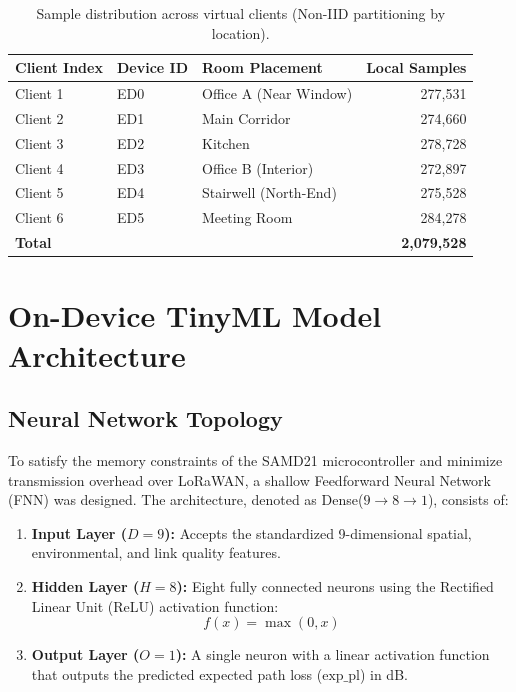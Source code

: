 \begin{table}[H]
  \centering
  \begin{tabular}{lllr}
    \toprule
    \textbf{Client Index} & \textbf{Device ID} & \textbf{Room Placement} & \textbf{Local Samples} \\
    \midrule
    Client 1 & ED0 & Office A (Near Window) & 277,531 \\
    Client 2 & ED1 & Main Corridor           & 274,660 \\
    Client 3 & ED2 & Kitchen                 & 278,728 \\
    Client 4 & ED3 & Office B (Interior)     & 272,897 \\
    Client 5 & ED4 & Stairwell (North-End)   & 275,528 \\
    Client 6 & ED5 & Meeting Room            & 284,278 \\
    \midrule
    \textbf{Total} & & & \textbf{2,079,528} \\
    \bottomrule
  \end{tabular}
  \caption{Sample distribution across virtual clients (Non-IID partitioning by location).}
  \label{tab:client-data}
\end{table}

\section{On-Device TinyML Model Architecture}
\label{sec:tinyml-arch}

\subsection{Neural Network Topology}
To satisfy the memory constraints of the SAMD21 microcontroller and minimize transmission overhead over LoRaWAN, a shallow Feedforward Neural Network (FNN) was designed. The architecture, denoted as Dense($9{\to}8{\to}1$), consists of:
\begin{enumerate}
    \item \textbf{Input Layer ($D=9$):} Accepts the standardized 9-dimensional spatial, environmental, and link quality features.
    \item \textbf{Hidden Layer ($H=8$):} Eight fully connected neurons using the Rectified Linear Unit (ReLU) activation function:
    \begin{equation}
        f(x) = \max(0, x)
    \end{equation}
    \item \textbf{Output Layer ($O=1$):} A single neuron with a linear activation function that outputs the predicted expected path loss ($\text{exp\_pl}$) in dB.
\end{enumerate}

